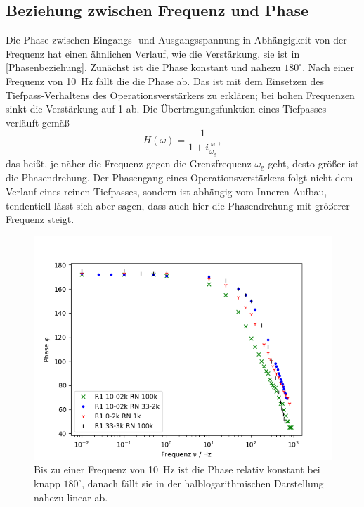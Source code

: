 \FloatBarrier

\subsection{Beziehung zwischen Frequenz und Phase}

Die Phase zwischen Eingangs- und Ausgangsspannung in Abhängigkeit von der Frequenz hat einen ähnlichen Verlauf, wie die Verstärkung, sie ist in \autoref{Phasenbeziehung}. Zunächst ist die Phase konstant und nahezu $180^\circ$. Nach einer Frequenz von \SI{10}{\hertz} fällt die die Phase ab. Das ist mit dem Einsetzen des Tiefpass-Verhaltens des Operationsverstärkers zu erklären; bei hohen Frequenzen sinkt die Verstärkung auf 1 ab. Die Übertragungsfunktion eines Tiefpasses verläuft gemäß
\begin{equation}
	H(\omega) = \frac{1}{1 + i\frac{\omega}{\omega_\text{g}}},
\end{equation}
das heißt, je näher die Frequenz gegen die Grenzfrequenz $\omega_\text{g}$ geht, desto größer ist die Phasendrehung. Der Phasengang eines Operationsverstärkers folgt nicht dem Verlauf eines reinen Tiefpasses, sondern ist abhängig vom Inneren Aufbau, tendentiell lässt sich aber sagen, dass auch hier die Phasendrehung mit größerer Frequenz steigt.

\begin{figure}[h]
	\centering
	\includegraphics[width=\textwidth]{img/j.png}
	\caption{Bis zu einer Frequenz von \SI{10}{\hertz} ist die Phase relativ konstant bei knapp $180^\circ$, danach fällt sie in der halblogarithmischen Darstellung nahezu linear ab.}
	\label{Phasenbeziehung}
\end{figure}

\FloatBarrier
